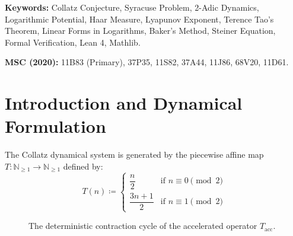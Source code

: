 \documentclass[11pt,a4paper]{article}
\theoremstyle{definition}
\begin{document}
\vspace{0.5em}
\noindent\textbf{Keywords:} Collatz Conjecture, Syracuse Problem, 2-Adic Dynamics, Logarithmic Potential, Haar Measure, Lyapunov Exponent, Terence Tao's Theorem, Linear Forms in Logarithms, Baker's Method, Steiner Equation, Formal Verification, Lean 4, Mathlib.

\noindent\textbf{MSC (2020):} 11B83 (Primary), 37P35, 11S82, 37A44, 11J86, 68V20, 11D61.

\newpage
\tableofcontents
\newpage

\section{Introduction and Dynamical Formulation}
The Collatz dynamical system is generated by the piecewise affine map $T : \mathbb{N}_{\ge 1} \to \mathbb{N}_{\ge 1}$ defined by:
\begin{equation}\label{eq:collatz_def}
T(n) \coloneqq \begin{cases}
\dfrac{n}{2} & \text{if } n \equiv 0 \pmod 2 \\[1em]
\dfrac{3n+1}{2} & \text{if } n \equiv 1 \pmod 2
\end{cases}
\end{equation}

\begin{figure}[htbp]
\centering
{}
\caption{The deterministic contraction cycle of the accelerated operator $T_{\mathrm{acc}}$.}
\label{fig:collatz_cycle}
\end{figure}
\end{document}
